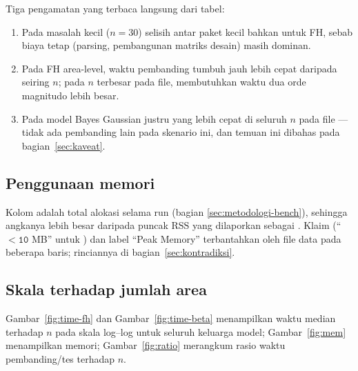 








Tiga pengamatan yang terbaca langsung dari tabel:

\begin{enumerate}[label=\arabic*.]
  \item Pada masalah kecil ($n=30$) selisih antar paket kecil bahkan untuk
        FH, sebab biaya tetap (parsing, pembangunan matriks desain) masih
        dominan.
  \item Pada FH area-level, waktu pembanding tumbuh jauh lebih cepat
        daripada  seiring $n$; pada $n$ terbesar pada file,
         membutuhkan waktu dua orde magnitudo lebih besar.
  \item Pada model Bayes Gaussian justru  yang lebih cepat
        di seluruh $n$ pada file --- tidak ada pembanding lain pada skenario
        ini, dan temuan ini dibahas pada bagian~\ref{sec:kaveat}.
\end{enumerate}

\subsection{Penggunaan memori}\label{sec:memori-bench}







Kolom  adalah total alokasi selama run (bagian
\ref{sec:metodologi-bench}), sehingga angkanya lebih besar daripada puncak RSS
yang dilaporkan  sebagai . Klaim
 (``$\mathtt{<10}$ MB'' untuk ) dan label
``Peak Memory'' terbantahkan oleh file data pada beberapa baris; rinciannya di
bagian~\ref{sec:kontradiksi}.

\subsection{Skala terhadap jumlah area}\label{sec:skala}

Gambar~\ref{fig:time-fh} dan Gambar~\ref{fig:time-beta} menampilkan waktu
median terhadap $n$ pada skala log--log untuk seluruh keluarga model;
Gambar~\ref{fig:mem} menampilkan memori; Gambar~\ref{fig:ratio} merangkum
rasio waktu pembanding/tes terhadap $n$.

